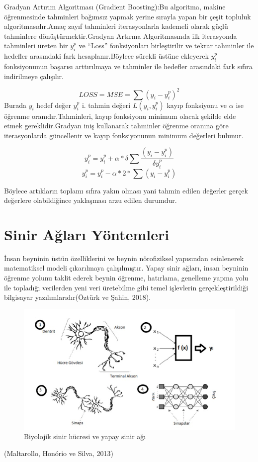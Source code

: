\documentclass[12pt,twoside]{deuthesis}
\begin{document}
Gradyan Artırım Algoritması (Gradient Boosting):Bu algoritma, makine öğrenmesinde tahminleri bağımsız yapmak yerine sırayla yapan bir çeşit topluluk algoritmasıdır.Amaç zayıf tahminleri iterasyonlarla kademeli olarak güçlü tahminlere dönüştürmektir.Gradyan Artırma Algoritmasında ilk iterasyonda tahminleri üreten bir \(y_{i}^{p}\) ve ``Loss'' fonksiyonları birleştirilir ve tekrar tahminler ile hedefler arasındaki fark hesaplanır.Böylece sürekli üstüne ekleyerek \(y_{i}^{p}\) fonksiyonunun başarısı arttırılmaya ve tahminler ile hedefler arasındaki fark sıfıra indirilmeye çalışılır.

\[ LOSS = MSE = \sum{(y_{i}-y_{i}^{p})^2} \]
Burada \(y_{i}\) hedef değer \(y_{i}^{p}\) i. tahmin değeri \(L(y_{i},y_{i}^{p})\) kayıp fonksiyonu ve \(\alpha\) ise öğrenme oranıdır.Tahminleri, kayıp fonksiyonu minimum olacak şekilde elde etmek gereklidir.Gradyan iniş kullanarak tahminler öğrenme oranına göre iterasyonlarda güncellenir ve kayıp fonksiyonunun minimum değerleri bulunur.

\[ y_{i}^{p} = y_{i}^{p} + \alpha * \delta \sum{\frac{(y_{i} - y_{i}^{p})}{\delta y_{i}^{p}}}\]
\[ y_{i}^{p} = y_{i}^{p} - \alpha * 2 * \sum{(y_{i} - y_{i}^{p})}\]

Böylece artıkların toplamı sıfıra yakın olması yani tahmin edilen değerler gerçek değerlere olabildiğince yaklaşması arzu edilen durumdur.

\hypertarget{sinir-aux11flarux131-yuxf6ntemleri}{%
\section{Sinir Ağları Yöntemleri}\label{sinir-aux11flarux131-yuxf6ntemleri}}

İnsan beyninin üstün özelliklerini ve beynin nörofiziksel yapısından esinlenerek matematiksel modeli çıkarılmaya çalışılmıştır. Yapay sinir ağları, insan beyninin öğrenme yolunu taklit ederek beynin öğrenme, hatırlama, genelleme yapma yolu ile topladığı verilerden yeni veri üretebilme gibi temel işlevlerin gerçekleştirildiği bilgisayar yazılımlarıdır(Öztürk ve Şahin, 2018).
\begin{figure}

{\centering \includegraphics[width=1\linewidth,height=0.27\textheight]{figure/ysa_1} 

}

\caption{Biyolojik sinir hücresi ve yapay sinir ağı}\label{fig:ysa}
\end{figure}
(Maltarollo, Honório ve Silva, 2013)
\end{document}
